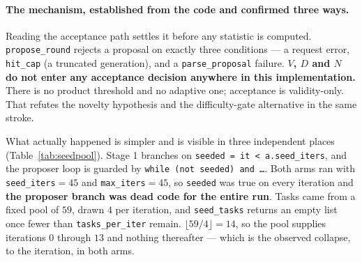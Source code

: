\paragraph{The mechanism, established from the code and confirmed three ways.} Reading the
acceptance path settles it before any statistic is computed. \texttt{propose\_round} rejects a
proposal on exactly three conditions --- a request error, \texttt{hit\_cap} (a truncated
generation), and a \texttt{parse\_proposal} failure. \textbf{$V$, $D$ and $N$ do not enter any
acceptance decision anywhere in this implementation.} There is no product threshold and no
adaptive one; acceptance is validity-only. That refutes the novelty hypothesis and the
difficulty-gate alternative in the same stroke.

What actually happened is simpler and is visible in three independent places
(Table~\ref{tab:seedpool}). Stage 1 branches on \texttt{seeded = it < a.seed\_iters}, and the
proposer loop is guarded by \texttt{while (not seeded) and \ldots}. Both arms ran with
\texttt{seed\_iters}$=45$ and \texttt{max\_iters}$=45$, so \texttt{seeded} was true on every
iteration and \textbf{the proposer branch was dead code for the entire run}. Tasks came from a
fixed pool of $59$, drawn $4$ per iteration, and \texttt{seed\_tasks} returns an empty list once
fewer than \texttt{tasks\_per\_iter} remain. $\lfloor 59/4 \rfloor = 14$, so the pool supplies
iterations $0$ through $13$ and nothing thereafter --- which is the observed collapse, to the
iteration, in both arms.

